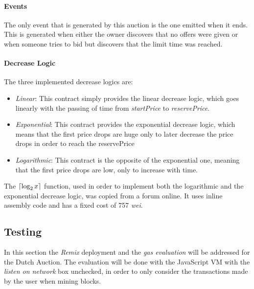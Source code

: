 \documentclass[11pt, a4paper]{report}
\DeclarePairedDelimiter{\ceil}{\lceil}{\rceil}
\begin{document}
	\paragraph*{Events}
	The only  event that is generated by this auction is the one emitted when it ends. This is generated when either the owner discovers that no offers were given or when someone tries to bid but discovers that the limit time was reached.
	
	
	\paragraph*{Decrease Logic}
	The three implemented decrease logics are:
	\begin{itemize}
		\item \emph{Linear}: This contract simply provides the linear decrease logic, which goes linearly with the passing of time from \emph{startPrice} to \emph{reservePrice}.
		\item \emph{Exponential}: This contract provides the exponential decrease logic, which means that the first price drops are huge only to later decrease the price drops in order to reach the reservePrice
		\item \emph{Logarithmic}: This contract is the opposite of the exponential one, meaning that the first price drops are low, only to increase with time.
	\end{itemize}
	The $\ceil{\log_2x}$ function, used in order to implement both the logarithmic and the exponential decrease logic, was copied from a forum online. It uses inline assembly code and has a fixed cost of 757 \emph{wei}.
	
	\subsection*{Testing}
	In this section the \emph{Remix} deployment and the \emph{gas evaluation} will be addressed for the Dutch Auction. The evaluation will be done with the JavaScript VM with the \emph{listen on network} box unchecked, in order to only consider the transactions made by the user when mining blocks.
	
\end{document}
